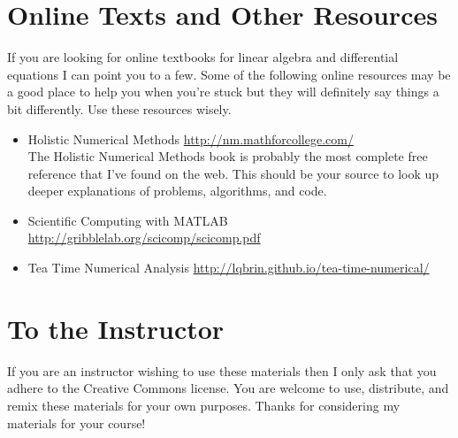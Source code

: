 \section{Online Texts and Other Resources}\label{pref:resources}
If you are looking for online textbooks for linear algebra and differential equations I
can point you to a few.  Some of the following online resources may be a good place to
help you when you're stuck but
they will definitely say things a bit differently. Use these resources wisely.
\begin{itemize}
    \item Holistic Numerical Methods
        \href{http://nm.mathforcollege.com/}{http://nm.mathforcollege.com/}\\
        The Holistic Numerical Methods book is probably the most complete free reference
        that I've found on the web.  This should be your source to look up deeper
        explanations of problems, algorithms, and code.
    \item Scientific Computing with MATLAB
        \href{http://gribblelab.org/scicomp/scicomp.pdf}{http://gribblelab.org/scicomp/scicomp.pdf}
    \item Tea Time Numerical Analysis
        \href{http://lqbrin.github.io/tea-time-numerical/}{http://lqbrin.github.io/tea-time-numerical/}
\end{itemize}


\section{To the Instructor}
If you are an instructor wishing to use these materials then I only ask that you adhere to the
Creative Commons license.  You are welcome to use, distribute, and remix these materials
for your own purposes.  Thanks for considering my materials for your course!


